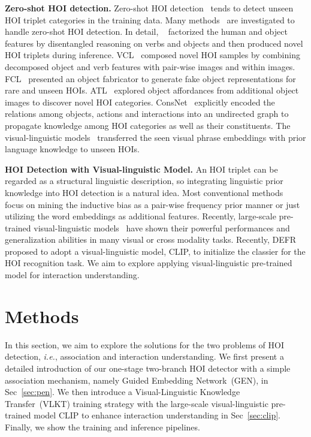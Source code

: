\documentclass[10pt,twocolumn,letterpaper]{article}
\begin{document}
\noindent\textbf{Zero-shot HOI detection.} Zero-shot HOI detection~\cite{shen2018scaling} tends to detect unseen HOI triplet categories in the training data. Many methods~\cite{shen2018scaling,gupta2019no,ulutan2020vsgnet,Bansal2020_aaai_functional,hou2020visual,hou2021detecting,hou2021affordance,xu2019learning,peyre2019detecting,liu2020consnet} are investigated to handle zero-shot HOI detection. In detail, ~\cite{shen2018scaling,gupta2019no,ulutan2020vsgnet,Bansal2020_aaai_functional} factorized the human and object features by disentangled reasoning on verbs and objects and then produced novel HOI triplets during inference. VCL~\cite{hou2020visual} composed novel HOI samples by combining decomposed object and verb features with pair-wise images and within images. FCL~\cite{hou2021detecting} presented an object fabricator to generate fake object representations for rare and unseen HOIs. ATL~\cite{hou2021affordance} explored object affordances from additional object images to discover novel HOI categories. ConsNet~\cite{liu2020consnet} explicitly encoded the relations among objects, actions and interactions into an undirected graph to propagate knowledge among HOI categories as well as their constituents. The visual-linguistic models~\cite{xu2019learning,peyre2019detecting} transferred the seen visual phrase embeddings with prior language knowledge to unseen HOIs. 

\noindent\textbf{HOI Detection with Visual-linguistic Model.} An HOI triplet can be regarded as a structural linguistic description, so integrating linguistic prior knowledge into HOI detection is a natural idea. Most conventional methods~\cite{Gao-ECCV-DRG,Kim_2021_CVPR,zhong2020polysemy,peyre2019detecting} focus on mining the inductive bias as a pair-wise frequency prior manner or just utilizing the word embeddings as additional features. Recently, large-scale pre-trained visual-linguistic models~\cite{radford2021learning,su2019vl,lu2019vilbert} have shown their powerful performances and generalization abilities in many visual or cross modality tasks. Recently, DEFR~\cite{jin2021object} proposed to adopt a visual-linguistic model, CLIP, to initialize the classier for the HOI recognition task.  We aim to explore applying visual-linguistic pre-trained model for interaction understanding.

\vspace{-2mm}
\section{Methods}
\vspace{-1mm}
In this section, we aim to explore the solutions for the two problems of HOI detection, \emph{i.e.}, association and interaction understanding. We first present a detailed introduction of our one-stage two-branch HOI detector with a simple association mechanism, namely Guided Embedding Network~(GEN), in Sec~\ref{sec:pen}. We then introduce a Visual-Linguistic Knowledge Transfer~(VLKT) training strategy with the large-scale visual-linguistic pre-trained model CLIP to enhance interaction understanding in Sec~\ref{sec:clip}. 
Finally, we show the training and inference pipelines.
\end{document}
